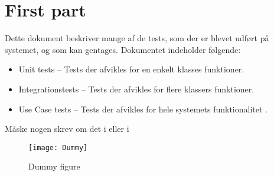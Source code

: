 \documentclass[Main]{subfiles}
\begin{document}
\section{First part}

Dette dokument beskriver mange af de tests, som der er blevet udført på systemet, og som kan gentages.
Dokumentet indeholder følgende:

\begin{itemize}
\item Unit tests -- Tests der afvikles for en enkelt klasses funktioner.
\item Integrationstests -- Tests der afvikles for flere klassers funktioner.
\item Use Case tests -- Tests der afvikles for hele systemets funktionalitet .
\end{itemize}

Måske nogen skrev om det i \cite{Krav} eller i \cite{Design}


\begin{figure}[hbtp]
\centering
\texttt{[image: Dummy]}
\caption{Dummy figure}
\label{fig:dummy1}
\end{figure}
\end{document}
